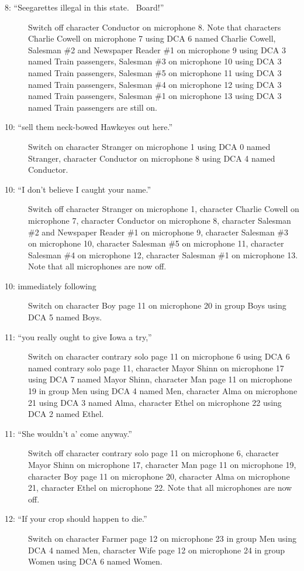 \begin{description}
\item[8: ``Seegarettes illegal in this state.~ Board!'']
Switch off character Conductor on microphone 8. Note that characters Charlie Cowell on microphone 7 using DCA 6 named Charlie Cowell, Salesman \#2 and Newspaper Reader \#1 on microphone 9 using DCA 3 named Train passengers, Salesman \#3 on microphone 10 using DCA 3 named Train passengers, Salesman \#5 on microphone 11 using DCA 3 named Train passengers, Salesman \#4 on microphone 12 using DCA 3 named Train passengers, Salesman \#1 on microphone 13 using DCA 3 named Train passengers are still on.  

\item[10: ``sell them neck-bowed Hawkeyes out here.'']
Switch on character Stranger on microphone 1 using DCA 0 named Stranger, character Conductor on microphone 8 using DCA 4 named Conductor. 

\item[10: ``I don't believe I caught your name.'']
Switch off character Stranger on microphone 1, character Charlie Cowell on microphone 7, character Conductor on microphone 8, character Salesman \#2 and Newspaper Reader \#1 on microphone 9, character Salesman \#3 on microphone 10, character Salesman \#5 on microphone 11, character Salesman \#4 on microphone 12, character Salesman \#1 on microphone 13. Note that all microphones are now off.

\item[10: immediately following]
Switch on character Boy page 11 on microphone 20 in group Boys using DCA 5 named Boys. 

\item[11: ``you really ought to give Iowa a try,'']
Switch on character contrary solo page 11 on microphone 6 using DCA 6 named contrary solo page 11, character Mayor Shinn on microphone 17 using DCA 7 named Mayor Shinn, character Man page 11 on microphone 19 in group Men using DCA 4 named Men, character Alma on microphone 21 using DCA 3 named Alma, character Ethel on microphone 22 using DCA 2 named Ethel. 

\item[11: ``She wouldn't a' come anyway.'']
Switch off character contrary solo page 11 on microphone 6, character Mayor Shinn on microphone 17, character Man page 11 on microphone 19, character Boy page 11 on microphone 20, character Alma on microphone 21, character Ethel on microphone 22. Note that all microphones are now off.

\item[12: ``If your crop should happen to die.'']
Switch on character Farmer page 12 on microphone 23 in group Men using DCA 4 named Men, character Wife page 12 on microphone 24 in group Women using DCA 6 named Women. 


\end{description}
